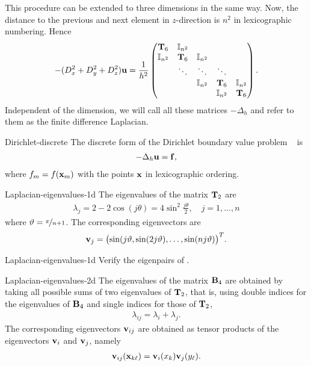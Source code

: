 \begin{remark}
  This procedure can be extended to three dimensions in the same
  way. Now, the distance to the previous and next element in
  $z$-direction is $n^2$ in lexicographic numbering. Hence
  \begin{gather}
    -(D_x^2+D_y^2+D_z^2) \vu = \frac1{h^2}
    \begin{pmatrix}
      \matt_6 & \id_{n^2} \\
      \id_{n^2} & \matt_6 & \id_{n^2} \\
      &\ddots & \ddots & \ddots \\
      &&\id_{n^2} & \matt_6 & \id_{n^2} \\
      &&&\id_{n^2} & \matt_6 \\
    \end{pmatrix}.
  \end{gather}
  Independent of the dimension, we will call all these matrices
  $-\Delta_h$ and refer to them as the finite difference Laplacian.
\end{remark}

\begin{Example}{Dirichlet-discrete}
  The discrete form of the Dirichlet boundary value problem
  ~ is
  \begin{gather}
    -\Delta_h \vu = \vf,
  \end{gather}
  where $f_m = f(\vx_m)$ with the points $\vx$ in lexicographic ordering.
\end{Example}

\begin{Lemma}{Laplacian-eigenvalues-1d}
  The eigenvalues of the matrix $\matt_2$ are
  \begin{gather}
    \lambda_j = 2 - 2\cos(j\theta) = 4 \sin^2 \frac{j\theta}2,
    \quad j=1,\dots, n
  \end{gather}
  where $\theta = \nicefrac{\pi}{n+1}$. The corresponding eigenvectors are
  \begin{gather}
    \vv_j = \bigl(\sin(j\theta,\sin(2j\theta),\dots,\sin(nj\theta)\bigr)^T.
  \end{gather}
\end{Lemma}

\begin{Problem}{Laplacian-eigenvalues-1d}
  Verify the eigenpairs of .
\end{Problem}

\begin{Lemma}{Laplacian-eigenvalues-2d}
  The eigenvalues of the matrix $\matb_4$ are obtained by taking all
  possible sums of two eigenvalues of $\matt_2$, that is, using double
  indices for the eigenvalues of $\matb_4$ and single indices for
  those of $\matt_2$,
  \begin{gather}
    \lambda_{ij} = \lambda_i+\lambda_j.
  \end{gather}
  The corresponding eigenvectors $\vv_{ij}$ are obtained as tensor
  products of the eigenvectors $\vv_i$ and $\vv_j$, namely
  \begin{gather}
    \vv_{ij}(\vx_{k\ell}) = \vv_i(x_k)\vv_j(y_\ell).
  \end{gather}
\end{Lemma}

